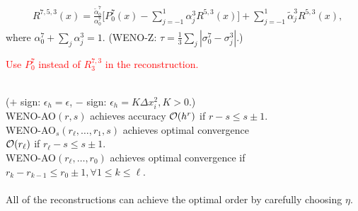\documentclass[11pt,landscape,usenames,dvipsnames,letterpaper,leqno]{article}
\def\largesize{\normalsize}%
\def\Maroon{\textcolor{mymaroon}}
\def\Red{\textcolor{Red}}
\def\Blue{\textcolor{myblue}}
\def\cO{{\cal O}}
\newcommand\head[1]{\medskip{\largesize\bf\Blue{#1}}}
\newcommand\subhead[1]{\smallskip{\it\Maroon{#1}}}
\begin{document}
{{%

\head{New Multilevel WENO-AO$(7,5,3)$}
\begin{align*} 
  \begin{split}
   & R^{7, 5, 3}(x) 
   = \frac{\tilde{\alpha}_0^{7}}{\alpha^{7}_0}\Big [P^{7}_0(x) - \sum_{j=-1}^1 \alpha^{3}_jR^{5,3}(x)\Big ] 
                                             + \sum_{j=-1}^1 \tilde{\alpha}^{3}_jR^{5, 3}(x),
  \end{split}
\end{align*}
where $\alpha_0^{7}+\sum_j\alpha_j^{3}=1$. (WENO-Z: $\tau = \frac{1}{3}\sum_j|\sigma^7_{0} - \sigma^3_j|$.)

\Red{Use $P^{7}_0$ instead of $R^{7,3}_{3}$ in the reconstruction.}

\head{Theorem: smooth case}\newline
\subhead{WENO-JS weights}\\ 
\vspace{-.05in}
($+$ sign: $\epsilon_h = \epsilon$, $-$ sign: $\epsilon_h = K\Delta x_i^2, K > 0$.)\\ 
WENO-AO$(r,s)$ achieves accuracy $\cO(h^r)$ if $r-s \leq s\pm 1$.\\
WENO-AO$_s(r_\ell, \ldots,r_1,s)$ achieves optimal convergence\\ \qquad $\cO(r_\ell)$ if $r_\ell-s \leq s\pm 1$.\\
WENO-AO$(r_\ell, \ldots,r_0)$ achieves optimal convergence if\\ \qquad $r_k-r_{k-1} \leq r_0\pm 1, \forall 1\leq k \leq \ell$.\\
\subhead{WENO-Z weights}\\
All of the reconstructions can achieve the optimal order by carefully choosing $\eta$.

}}
\end{document}
